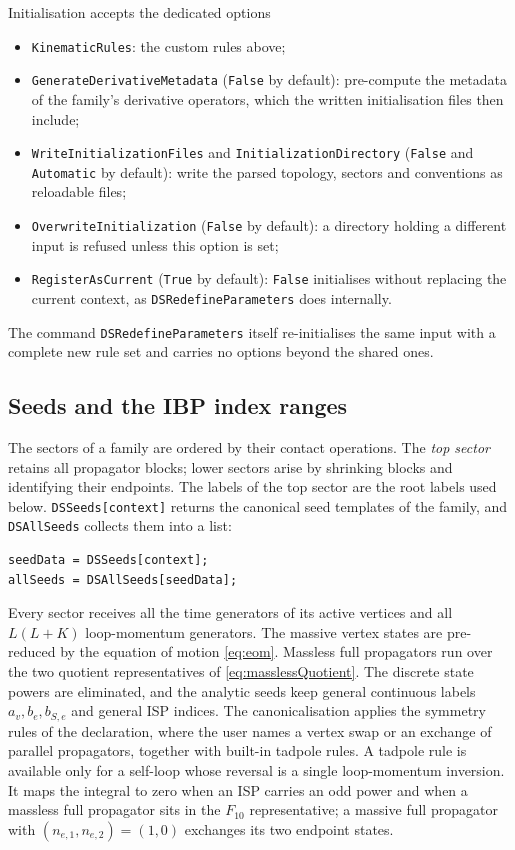 \documentclass[11pt,a4paper]{article}
\begin{document}
Initialisation accepts the dedicated options
\begin{itemize}
\item \texttt{KinematicRules}: the custom rules above;
\item \texttt{GenerateDerivativeMetadata} (\texttt{False} by default): pre-compute the metadata of
the family's derivative operators, which the written initialisation files then include;
\item \texttt{WriteInitializationFiles} and \texttt{InitializationDirectory} (\texttt{False} and
\texttt{Automatic} by default): write the parsed topology, sectors and conventions as reloadable
files;
\item \texttt{OverwriteInitialization} (\texttt{False} by default): a directory holding a different
input is refused unless this option is set;
\item \texttt{RegisterAsCurrent} (\texttt{True} by default): \texttt{False} initialises without
replacing the current context, as \texttt{DSRedefineParameters} does internally.
\end{itemize}
The command \texttt{DSRedefineParameters} itself
re-initialises the same input with a complete new rule set and carries no options beyond the shared
ones.

\subsection{Seeds and the IBP index ranges}
\label{sec:seeds}

The sectors of a family are ordered by their contact operations. The \emph{top sector} retains
all propagator blocks; lower sectors arise by shrinking blocks and identifying their endpoints.
The labels of the top sector are the root labels used below.
\texttt{DSSeeds[context]} returns the canonical seed templates of the family, and
\texttt{DSAllSeeds} collects them into a list:
\begin{verbatim}
seedData = DSSeeds[context];
allSeeds = DSAllSeeds[seedData];
\end{verbatim}
Every sector
receives all the time generators of its active vertices and all $L(L+K)$ loop-momentum generators.
The massive vertex
states are pre-reduced by the equation of motion \eqref{eq:eom}. Massless full propagators run over
the two quotient representatives of \eqref{eq:masslessQuotient}. The discrete state powers are
eliminated, and the analytic seeds keep
general continuous labels $a_v,b_e,b_{S,e}$ and general ISP indices.
The canonicalisation applies the symmetry rules of the
declaration, where the user names a vertex swap or an exchange of parallel propagators, together with
built-in tadpole rules. A tadpole rule is available only for a self-loop whose reversal is a single
loop-momentum inversion. It maps the integral to zero when an ISP carries an odd power and when a
massless full propagator sits in the $F_{10}$ representative; a massive full propagator with
$(n_{e,1},n_{e,2})=(1,0)$ exchanges its two endpoint states.
\end{document}
